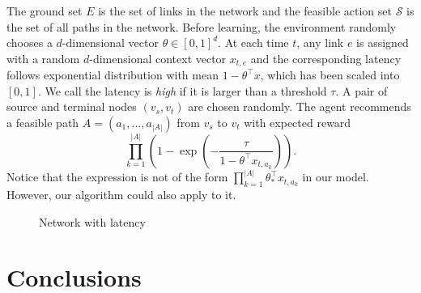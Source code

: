 \documentclass{article}
\newcommand{\cS}{\mathcal{S}}
\begin{document}
The ground set $E$ is the set of links in the network and the feasible action set $\cS$ is the set of all paths in the network. Before learning, the environment randomly chooses a $d$-dimensional vector $\theta \in [0,1]^d$. At each time $t$, any link $e$ is assigned with a random $d$-dimensional context vector $x_{t,e}$ and the corresponding latency follows exponential distribution with mean $1-\theta^{\top}x$, which has been scaled into $[0,1]$. We call the latency is {\it high} if it is larger than a threshold $\tau$. A pair of source and terminal nodes $(v_s, v_t)$ are chosen randomly. The agent recommends a feasible path $A = (a_1,...,a_{|A|})$ from $v_s$ to $v_t$ with expected reward
$$
\prod_{k=1}^{|A|} (1- \exp(-\frac{\tau}{1-\theta^{\top}x_{t,a_k}})).
$$
Notice that the expression is not of the form $\prod_{k=1}^{|A|}\theta_*^{\top}x_{t,a_k}$ in our model. However, our algorithm could also apply to it.

\begin{figure}
	\centering
	\caption{Network with latency}
	\label{fig:sample number} %
\end{figure}

\section{Conclusions}
\end{document}
